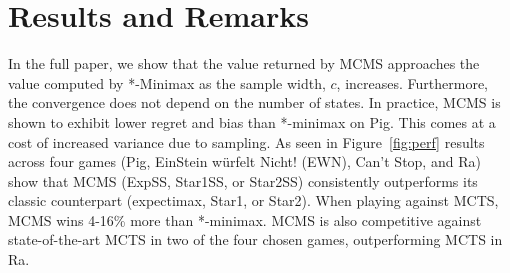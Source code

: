 \documentclass{article}
\begin{document}
\section{Results and Remarks}

In the full paper, we show that the value returned by MCMS approaches the value computed 
by *-Minimax as the sample width, $c$, increases. 
Furthermore, the convergence does not depend on the number of states. 
In practice, MCMS is shown to exhibit lower regret and bias than *-minimax on Pig. 
This comes at a cost of increased variance due to sampling. 
As seen in Figure~\ref{fig:perf} results across four games (Pig, EinStein w\"{u}rfelt Nicht! (EWN), Can't Stop, and Ra)
show that MCMS (ExpSS, Star1SS, or Star2SS) 
consistently outperforms its classic counterpart (expectimax, Star1, or Star2). 
When playing against MCTS, MCMS wins 4-16\% more than *-minimax. 
MCMS is also competitive against state-of-the-art MCTS in two of the four chosen games, outperforming 
MCTS in Ra. 



\end{document}
